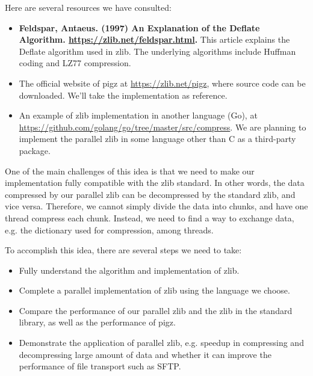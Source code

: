\documentclass[11pt]{article}
\begin{document}
	Here are several resources we have consulted:
	\begin{itemize}
		\item \textbf{Feldspar, Antaeus. (1997) An Explanation of the Deflate Algorithm. \url{https://zlib.net/feldspar.html}.} This article explains the Deflate algorithm used in zlib. The underlying algorithms include Huffman coding and LZ77 compression.
		\item The official website of pigz at \url{https://zlib.net/pigz}, where source code can be downloaded. We'll take the implementation as reference.
		\item An example of zlib implementation in another language (Go), at \url{https://github.com/golang/go/tree/master/src/compress}. We are planning to implement the parallel zlib in some language other than C as a third-party package.
	\end{itemize}
	
	One of the main challenges of this idea is that we need to make our implementation fully compatible with the zlib standard. In other words, the data compressed by our parallel zlib can be decompressed by the standard zlib, and vice versa. Therefore, we cannot simply divide the data into chunks, and have one thread compress each chunk. Instead, we need to find a way to exchange data, e.g. the dictionary used for compression, among threads.
	
	To accomplish this idea, there are several steps we need to take:
	\begin{itemize}
		\item Fully understand the algorithm and implementation of zlib.
		\item Complete a parallel implementation of zlib using the language we choose.
		\item Compare the performance of our parallel zlib and the zlib in the standard library, as well as the performance of pigz.
		\item Demonstrate the application of parallel zlib, e.g. speedup in compressing and decompressing large amount of data and whether it can improve the performance of file transport such as SFTP. 
	\end{itemize}
	
\end{document}
